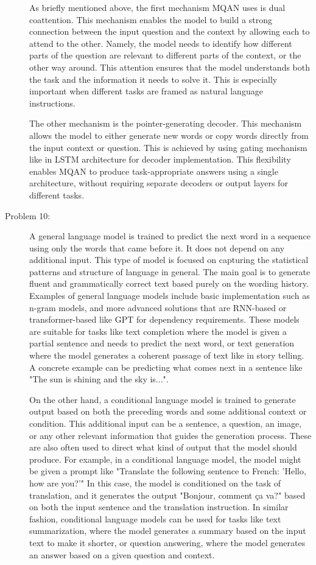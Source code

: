 \documentclass[10pt]{article}
\begin{document}
\begin{description}
As briefly mentioned above, the first mechanism MQAN uses is dual coattention.
This mechanism enables the model to build a strong connection between the input question and the context by allowing each to attend to the other. 
Namely, the model needs to identify how different parts of the question are relevant to different parts of the context, or the other way around.
This attention ensures that the model understands both the task and the information it needs to solve it. 
This is especially important when different tasks are framed as natural language instructions.

The other mechanism is the pointer-generating decoder.
This mechanism allows the model to either generate new words or copy words directly from the input context or question.
This is achieved by using gating mechanism like in LSTM architecture for decoder implementation.
This flexibility enables MQAN to produce task-appropriate answers using a single architecture, without requiring separate decoders or output layers for different tasks.

\item[Problem 10:] \hfill %

A general language model is trained to predict the next word in a sequence using only the words that came before it.
It does not depend on any additional input. This type of model is focused on capturing the statistical patterns and structure
of language in general. The main goal is to generate fluent and grammatically correct text based purely on the wording history.
Examples of general language models include basic implementation such as n-gram models, and more advanced solutions that are RNN-based or transformer-based like GPT for
dependency requirements.
These models are suitable for tasks like text completion where the model is given a partial sentence and needs to predict the next word, 
or text generation where the model generates a coherent passage of text like in story telling. A concrete example can be predicting what comes next in a sentence like "The sun is shining and the sky is...".

On the other hand, a conditional language model is trained to generate output based on both the preceding words and some additional context or condition.
This additional input can be a sentence, a question, an image, or any other relevant information that guides the generation process.
These are also often used to direct what kind of output that the model should produce.
For example, in a conditional language model, the model might be given a prompt like "Translate the following sentence to French: 'Hello, how are you?'"
In this case, the model is conditioned on the task of translation, and it generates the output "Bonjour, comment ça va?" based on both the input sentence and the translation instruction.
In similar fashion, conditional language models can be used for tasks like text summarization, where the model generates a summary based on the input text to make it shorter,
or question answering, where the model generates an answer based on a given question and context.

\end{description}
\end{document}
